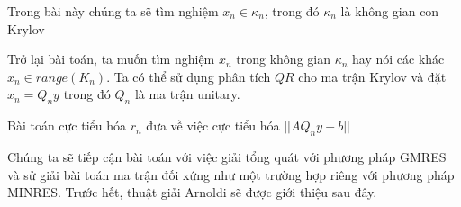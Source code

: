 Trong bài này chúng ta sẽ tìm nghiệm $x_n \in \kappa_n$, trong đó $\kappa_n$ là không gian con Krylov



Trở lại bài toán, ta muốn tìm nghiệm $x_n$ trong không gian $\kappa_n$ hay nói 
các khác $x_n \in range(K_n)$. Ta có thể sử dụng phân tích $QR$ cho ma trận Krylov và
đặt $x_n = Q_ny$ trong đó $Q_n$ là ma trận unitary. 

Bài toán cực tiểu hóa $r_n$ đưa về việc cực tiểu hóa $||AQ_ny - b||$


Chúng ta sẽ tiếp cận bài toán với việc giải tổng quát với phương pháp GMRES 
và sử giải bài toán ma trận đối xứng như một trường hợp riêng với phương pháp MINRES.
Trước hết, thuật giải Arnoldi sẽ được giới thiệu sau đây.